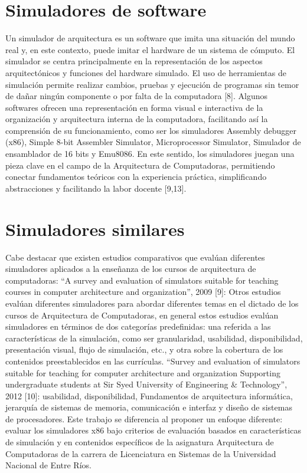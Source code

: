 \documentclass[12pt,twoside]{templates/unerthesis}
\begin{document}
\hypertarget{simuladores-de-software}{%
\section{Simuladores de software}\label{simuladores-de-software}}

Un simulador de arquitectura es un software que imita una situación del mundo real y, en este contexto, puede imitar el hardware de un sistema de cómputo. El simulador se centra principalmente en la representación de los aspectos arquitectónicos y funciones del hardware simulado. El uso de herramientas de simulación permite realizar cambios, pruebas y ejecución de programas sin temor de dañar ningún componente o por falta de la computadora {[}8{]}.
Algunos softwares ofrecen una representación en forma visual e interactiva de la organización y arquitectura interna de la computadora, facilitando así la comprensión de su funcionamiento, como ser los simuladores Assembly debugger (x86), Simple 8-bit Assembler Simulator, Microprocessor Simulator, Simulador de ensamblador de 16 bits y Emu8086. En este sentido, los simuladores juegan una pieza clave en el campo de la Arquitectura de Computadoras, permitiendo conectar fundamentos teóricos con la experiencia práctica, simpliﬁcando abstracciones y facilitando la labor docente {[}9,13{]}.

\hypertarget{simuladores-similares}{%
\section{Simuladores similares}\label{simuladores-similares}}

Cabe destacar que existen estudios comparativos que evalúan diferentes simuladores aplicados a la enseñanza de los cursos de arquitectura de computadoras:
``A survey and evaluation of simulators suitable for teaching courses in computer architecture and organization'', 2009 {[}9{]}: Otros estudios evalúan diferentes simuladores para abordar diferentes temas en el dictado de los cursos de Arquitectura de Computadoras, en general estos estudios evalúan simuladores en términos de dos categorías predefinidas: una referida a las características de la simulación, como ser granularidad, usabilidad, disponibilidad, presentación visual, flujo de simulación, etc., y otra sobre la cobertura de los contenidos preestablecidos en las currículas.
``Survey and evaluation of simulators suitable for teaching for computer architecture and organization Supporting undergraduate students at Sir Syed University of Engineering \& Technology'', 2012 {[}10{]}: usabilidad, disponibilidad, Fundamentos de arquitectura informática, jerarquía de sistemas de memoria, comunicación e interfaz y diseño de sistemas de procesadores.
Este trabajo se diferencia al proponer un enfoque diferente: evaluar los simuladores x86 bajo criterios de evaluación basados en características de simulación y en contenidos específicos de la asignatura Arquitectura de Computadoras de la carrera de Licenciatura en Sistemas de la Universidad Nacional de Entre Ríos.
\end{document}
